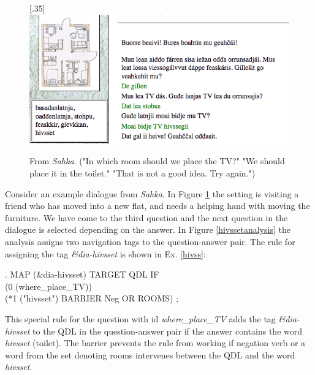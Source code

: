 \documentclass[11pt]{article}
\begin{document}
\begin{figure}[htbp]
\begin{center}
\scalebox{.35}[.35]{\includegraphics{presentation/img/TVhivssegii.png}}\\
\caption{From \textit{Sahka}. ("In which room should we place the TV?" "We should place it in the toilet." "That is not a good idea. Try again.")
}
\label{sahka}
\end{center}
\end{figure}


Consider an example dialogue from \textit{Sahka}. In Figure \ref{sahka} the setting is visiting a friend who has moved into a new flat, and needs a helping hand with moving the furniture. We have come to the third question and the next question in the dialogue is selected depending on the answer. In Figure \ref{hivssetanalysis} the analysis assigns two navigation tags to the question-answer pair. 
The rule for assigning the tag \textit{\&dia-hivsset} is shown in Ex. \ref{hivss}:

\ex.\flushleft \label{hivss} \small MAP (\&dia-hivsset) TARGET QDL IF \\
     (0 (where\_place\_TV))\\(*1 ("hivsset") BARRIER Neg OR ROOMS) ;

This special rule for the question with id \textit{where\_place\_TV} adds the tag \textit{\&dia-hivsset} to the QDL in the question-answer pair if the answer contains the word \textit{hivsset} (toilet). The barrier prevents the rule from working if negation verb or a word from the set denoting rooms intervenes between the QDL and the word \textit{hivsset}. \\
\end{document}
